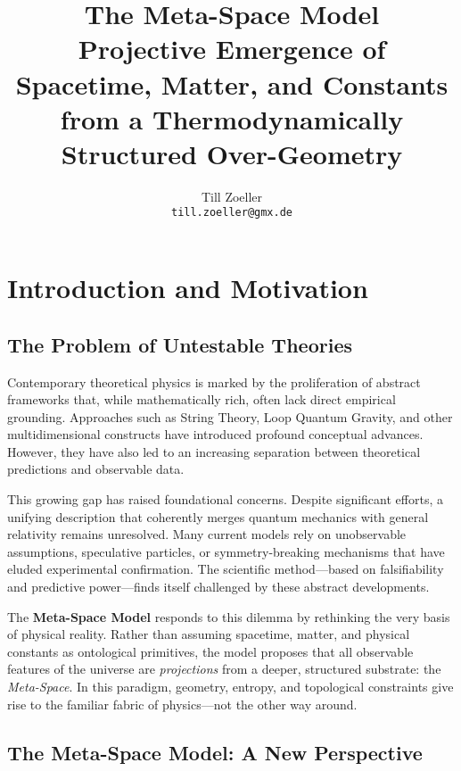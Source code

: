 \documentclass[10.5pt,a4paper]{article}
\title{The Meta-Space Model\\\large Projective Emergence of Spacetime, Matter, and Constants from a Thermodynamically Structured Over-Geometry}
\author{Till Zoeller\\\texttt{till.zoeller@gmx.de}}
\date{}
\begin{document}
\maketitle
\tableofcontents
\newpage
\sloppy

\clearpage

\section{Introduction and Motivation}

\subsection{The Problem of Untestable Theories}

Contemporary theoretical physics is marked by the proliferation of abstract frameworks that, while mathematically rich, often lack direct empirical grounding. Approaches such as String Theory, Loop Quantum Gravity, and other multidimensional constructs have introduced profound conceptual advances. However, they have also led to an increasing separation between theoretical predictions and observable data.

This growing gap has raised foundational concerns. Despite significant efforts, a unifying description that coherently merges quantum mechanics with general relativity remains unresolved. Many current models rely on unobservable assumptions, speculative particles, or symmetry-breaking mechanisms that have eluded experimental confirmation. The scientific method—based on falsifiability and predictive power—finds itself challenged by these abstract developments.

The \textbf{Meta-Space Model} responds to this dilemma by rethinking the very basis of physical reality. Rather than assuming spacetime, matter, and physical constants as ontological primitives, the model proposes that all observable features of the universe are \emph{projections} from a deeper, structured substrate: the \emph{Meta-Space}. In this paradigm, geometry, entropy, and topological constraints give rise to the familiar fabric of physics—not the other way around.

\subsection{The Meta-Space Model: A New Perspective}
\end{document}
